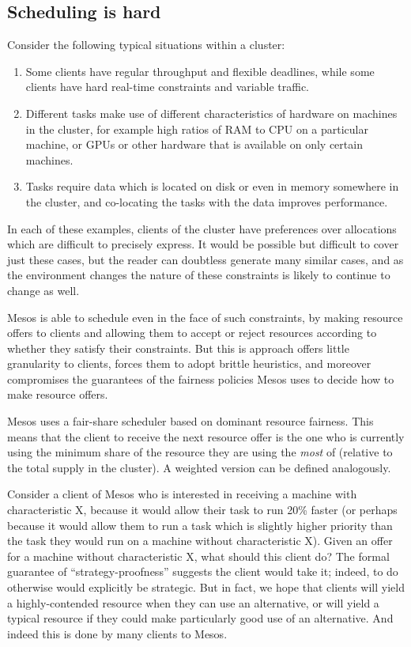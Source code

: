 \documentclass{acm_proc_article-sp}
\begin{document}
\subsection{Scheduling is hard}
Consider the following typical situations within a cluster:
\begin{enumerate}
  \item Some clients have regular throughput and flexible deadlines, while some
    clients have hard real-time constraints and variable traffic.
  \item Different tasks make use of different characteristics of hardware on
    machines in the cluster, for example high ratios of RAM to CPU on a
    particular machine, or GPUs or other hardware that is available on only
    certain machines.
  \item Tasks require data which is located on disk or even in memory somewhere
    in the cluster, and co-locating the tasks with the data improves
    performance.
\end{enumerate}
In each of these examples, clients of the cluster have preferences over
allocations which are difficult to precisely express. It would be possible but
difficult to cover just these cases, but the reader can doubtless generate many
similar cases, and as the environment changes the nature of these constraints is
likely to continue to change as well. 

Mesos is able to schedule even in the face of such constraints, by making
resource offers to clients and allowing them to accept or reject resources
according to whether they satisfy their constraints. But this is approach offers
little granularity to clients, forces them to adopt brittle heuristics, and
moreover compromises the guarantees of the fairness policies Mesos uses to
decide how to make resource offers.

Mesos uses a fair-share scheduler based on dominant resource fairness. This
means that the client to receive the next resource offer is the one who is
currently using the minimum share of the resource they are using the \emph{most}
of (relative to the total supply in the cluster). A weighted version can be
defined analogously. 

Consider a client of Mesos who is interested in receiving a machine with
characteristic X, because it would allow their task to run 20\% faster (or
perhaps because it would allow them to run a task which is slightly higher
priority than the task they would run on a machine without characteristic X).
Given an offer for a machine without characteristic X, what should this client
do? The formal guarantee of ``strategy-proofness'' suggests the client would take
it; indeed, to do otherwise would explicitly be strategic. But in fact, we hope
that clients will yield a highly-contended resource when they can use an
alternative, or will yield a typical resource if they could make particularly
good use of an alternative. And indeed this is done by many clients to Mesos.
\end{document}
